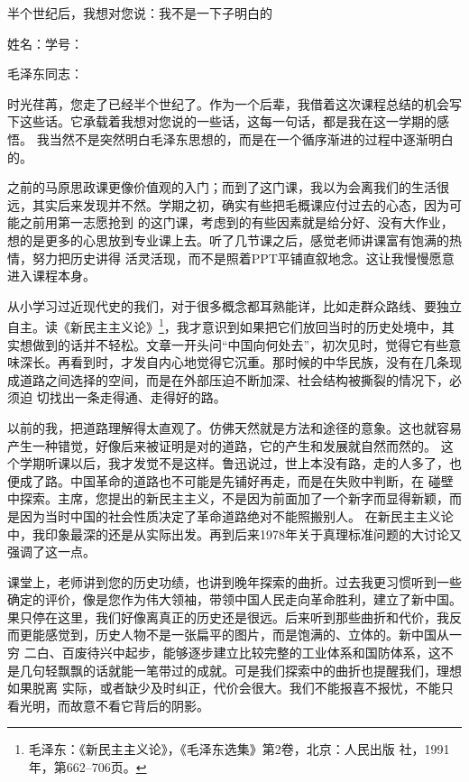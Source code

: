 \documentclass[12pt,a4paper]{ctexart}
\begin{document}
\begin{center}
    {\heiti 半个世纪后，我想对您说：我不是一下子明白的\par}
    \vspace{0.8em}
    {\kaishu 姓名：\underline{\hspace{3.5cm}}\qquad 学号：\underline{\hspace{4cm}}\par}
\end{center}

\vspace{1em}

{\songti\setlength{\baselineskip}{20pt}\selectfont

毛泽东同志：

时光荏苒，您走了已经半个世纪了。作为一个后辈，我借着这次课程总结的机会写下这些话。它承载着我想对您说的一些话，这每一句话，都是我在这一学期的感悟。
我当然不是突然明白毛泽东思想的，而是在一个循序渐进的过程中逐渐明白的。

之前的马原思政课更像价值观的入门；而到了这门课，我以为会离我们的生活很远，其实后来发现并不然。学期之初，确实有些把毛概课应付过去的心态，因为可能之前用第一志愿抢到
的这门课，考虑到的有些因素就是给分好、没有大作业，想的是更多的心思放到专业课上去。听了几节课之后，感觉老师讲课富有饱满的热情，努力把历史讲得
活灵活现，而不是照着PPT平铺直叙地念。这让我慢慢愿意进入课程本身。

从小学习过近现代史的我们，对于很多概念都耳熟能详，比如走群众路线、要独立自主。读《新民主主义论》\footnote{毛泽东：《新民主主义论》，《毛泽东选集》第2卷，北京：人民出版
社，1991年，第662--706页。}，我才意识到如果把它们放回当时的历史处境中，其实想做到的话并不轻松。文章一开头问“中国向何处去”，初次见时，觉得它有些意
味深长。再看到时，才发自内心地觉得它沉重。那时候的中华民族，没有在几条现成道路之间选择的空间，而是在外部压迫不断加深、社会结构被撕裂的情况下，必须迫
切找出一条走得通、走得好的路。

以前的我，把道路理解得太直观了。仿佛天然就是方法和途径的意象。这也就容易产生一种错觉，好像后来被证明是对的道路，它的产生和发展就自然而然的。
这个学期听课以后，我才发觉不是这样。鲁迅说过，世上本没有路，走的人多了，也便成了路。中国革命的道路也不可能是先铺好再走，而是在失败中判断，在
碰壁中探索。主席，您提出的新民主主义，不是因为前面加了一个新字而显得新颖，而是因为当时中国的社会性质决定了革命道路绝对不能照搬别人。
在新民主主义论中，我印象最深的还是从实际出发。再到后来1978年关于真理标准问题的大讨论又强调了这一点。

课堂上，老师讲到您的历史功绩，也讲到晚年探索的曲折。过去我更习惯听到一些确定的评价，像是您作为伟大领袖，带领中国人民走向革命胜利，建立了新中国。
果只停在这里，我们好像离真正的历史还是很远。后来听到那些曲折和代价，我反而更能感觉到，历史人物不是一张扁平的图片，而是饱满的、立体的。新中国从一穷
二白、百废待兴中起步，能够逐步建立比较完整的工业体系和国防体系，这不是几句轻飘飘的话就能一笔带过的成就。可是我们探索中的曲折也提醒我们，理想如果脱离
实际，或者缺少及时纠正，代价会很大。我们不能报喜不报忧，不能只看光明，而故意不看它背后的阴影。

}
\end{document}
